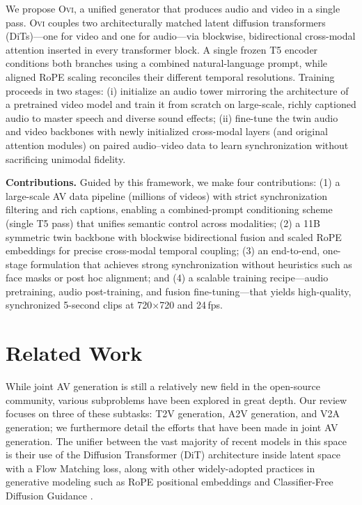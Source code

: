 \documentclass{article} %
\begin{document}
We propose \textsc{Ovi}, a unified generator that produces audio and video in a single pass. \textsc{Ovi} couples two architecturally matched latent diffusion transformers (DiTs)—one for video and one for audio—via blockwise, bidirectional cross-modal attention inserted in every transformer block. A single frozen T5 encoder conditions both branches using a combined natural-language prompt, while aligned RoPE scaling reconciles their different temporal resolutions. Training proceeds in two stages: (i) initialize an audio tower mirroring the architecture of a pretrained video model and train it from scratch on large-scale, richly captioned audio to master speech and diverse sound effects; (ii) fine-tune the twin audio and video backbones with newly initialized cross-modal layers (and original attention modules) on paired audio–video data to learn synchronization without sacrificing unimodal fidelity.

\textbf{Contributions.} Guided by this framework, we make four contributions: (1) a large-scale AV data pipeline (millions of videos) with strict synchronization filtering and rich captions, enabling a combined-prompt conditioning scheme (single T5 pass) that unifies semantic control across modalities; (2) a 11B symmetric twin backbone with blockwise bidirectional fusion and scaled RoPE embeddings for precise cross-modal temporal coupling; (3) an end-to-end, one-stage formulation that achieves strong synchronization without heuristics such as face masks or post hoc alignment; and (4) a scalable training recipe—audio pretraining, audio post-training, and fusion fine-tuning—that yields high-quality, synchronized 5-second clips at 720$\times$720 and 24\,fps.

\section{Related Work}

While joint AV generation is still a relatively new field in the open-source community, various subproblems have been explored in great depth. Our review focuses on three of these subtasks: T2V generation, A2V generation, and V2A generation; we furthermore detail the efforts that have been made in joint AV generation. The unifier between the vast majority of recent models in this space is their use of the Diffusion Transformer (DiT) architecture \citep{peebles2023scalable} inside latent space with a Flow Matching \citep{lipman2022flow} loss, along with other widely-adopted practices in generative modeling such as RoPE positional embeddings \citep{su2024roformer} and Classifier-Free Diffusion Guidance \citep{ho2022classifier}. 
\end{document}

